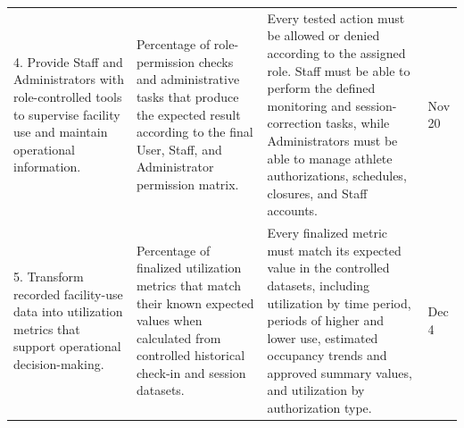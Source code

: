 \begin{center}
\begin{longtable}{L{3.1cm} L{4.2cm} L{4.2cm} L{1.8cm}}
4. Provide Staff and Administrators with role-controlled tools to supervise facility use and maintain operational information.
&
Percentage of role-permission checks and administrative tasks that produce the expected result according to the final User, Staff, and Administrator permission matrix.
&
Every tested action must be allowed or denied according to the assigned role. Staff must be able to perform the defined monitoring and session-correction tasks, while Administrators must be able to manage athlete authorizations, schedules, closures, and Staff accounts.
&
Nov 20 \\
\addlinespace
\midrule
\addlinespace

5. Transform recorded facility-use data into utilization metrics that support operational decision-making.
&
Percentage of finalized utilization metrics that match their known expected values when calculated from controlled historical check-in and session datasets.
&
Every finalized metric must match its expected value in the controlled datasets, including utilization by time period, periods of higher and lower use, estimated occupancy trends and approved summary values, and utilization by authorization type.
&
Dec 4 \\
\end{longtable}
\end{center}

